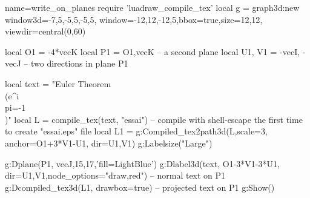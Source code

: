\documentclass[border=5pt]{standalone}%
\begin{document}
\begin{luadraw}{name=write_on_planes}
require 'luadraw_compile_tex'
local g = graph3d:new{ window3d={-7,5,-5,5,-5,5}, window={-12,12,-12,5},bbox=true,size={12,12}, viewdir=central(0,60) }

local O1 =  -4*vecK
local P1 = {O1,vecK} -- a second plane
local U1, V1 = -vecI, -vecJ -- two directions in plane P1

local text = "Euler Theorem \\(e^{i\\pi}=-1\\)"
local L = compile_tex(text, "essai") -- compile with shell-escape the first time to create "essai.eps" file
local L1 = g:Compiled_tex2path3d(L,{scale=3, anchor=O1+3*V1-U1, dir={U1,V1}})
g:Labelsize("Large")

g:Dplane(P1, vecJ,15,17,'fill=LightBlue')
g:Dlabel3d(text, O1-3*V1-3*U1, {dir={U1,V1},node_options="draw,red"}) -- normal text on P1
g:Dcompiled_tex3d(L1, {drawbox=true}) -- projected text on P1
g:Show()
\end{luadraw}
\end{document}
